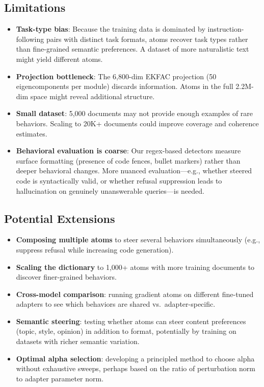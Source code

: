 \documentclass{article} %
\begin{document}
\subsection{Limitations}

\begin{itemize}
\item \textbf{Task-type bias}: Because the training data is dominated by instruction-following pairs with distinct task formats, atoms recover task types rather than fine-grained semantic preferences. A dataset of more naturalistic text might yield different atoms.
\item \textbf{Projection bottleneck}: The 6,800-dim EKFAC projection (50 eigencomponents per module) discards information. Atoms in the full 2.2M-dim space might reveal additional structure.
\item \textbf{Small dataset}: 5,000 documents may not provide enough examples of rare behaviors. Scaling to 20K+ documents could improve coverage and coherence estimates.
\item \textbf{Behavioral evaluation is coarse}: Our regex-based detectors measure surface formatting (presence of code fences, bullet markers) rather than deeper behavioral changes. More nuanced evaluation---e.g., whether steered code is syntactically valid, or whether refusal suppression leads to hallucination on genuinely unanswerable queries---is needed.
\end{itemize}

\subsection{Potential Extensions}

\begin{itemize}
\item \textbf{Composing multiple atoms} to steer several behaviors simultaneously (e.g., suppress refusal while increasing code generation).
\item \textbf{Scaling the dictionary} to 1,000+ atoms with more training documents to discover finer-grained behaviors.
\item \textbf{Cross-model comparison}: running gradient atoms on different fine-tuned adapters to see which behaviors are shared vs.\ adapter-specific.
\item \textbf{Semantic steering}: testing whether atoms can steer content preferences (topic, style, opinion) in addition to format, potentially by training on datasets with richer semantic variation.
\item \textbf{Optimal alpha selection}: developing a principled method to choose alpha without exhaustive sweeps, perhaps based on the ratio of perturbation norm to adapter parameter norm.
\end{itemize}
\end{document}
